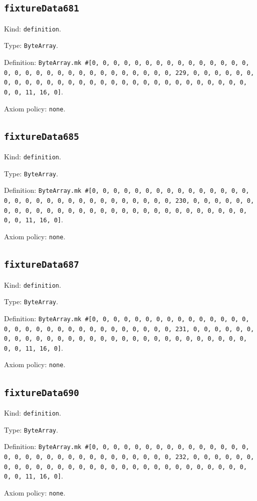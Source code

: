 \documentclass[11pt]{article}
\begin{document}
\subsection*{\texttt{fixtureData681}}
\noindent Kind: \texttt{definition}.\par
\noindent Type: \texttt{ByteArray}.\par
\noindent Definition: \texttt{ByteArray.mk \#[0, 0, 0, 0, 0, 0, 0, 0, 0, 0, 0, 0, 0, 0, 0, 0, 0, 0, 0, 0, 0, 0, 0, 0, 0, 0, 0, 0, 0, 0, 0, 229, 0, 0, 0, 0, 0, 0, 0, 0, 0, 0, 0, 0, 0, 0, 0, 0, 0, 0, 0, 0, 0, 0, 0, 0, 0, 0, 0, 0, 0, 0, 0, 11, 16, 0]}.\par
\noindent Axiom policy: \texttt{none}.\par
\subsection*{\texttt{fixtureData685}}
\noindent Kind: \texttt{definition}.\par
\noindent Type: \texttt{ByteArray}.\par
\noindent Definition: \texttt{ByteArray.mk \#[0, 0, 0, 0, 0, 0, 0, 0, 0, 0, 0, 0, 0, 0, 0, 0, 0, 0, 0, 0, 0, 0, 0, 0, 0, 0, 0, 0, 0, 0, 0, 230, 0, 0, 0, 0, 0, 0, 0, 0, 0, 0, 0, 0, 0, 0, 0, 0, 0, 0, 0, 0, 0, 0, 0, 0, 0, 0, 0, 0, 0, 0, 0, 11, 16, 0]}.\par
\noindent Axiom policy: \texttt{none}.\par
\subsection*{\texttt{fixtureData687}}
\noindent Kind: \texttt{definition}.\par
\noindent Type: \texttt{ByteArray}.\par
\noindent Definition: \texttt{ByteArray.mk \#[0, 0, 0, 0, 0, 0, 0, 0, 0, 0, 0, 0, 0, 0, 0, 0, 0, 0, 0, 0, 0, 0, 0, 0, 0, 0, 0, 0, 0, 0, 0, 231, 0, 0, 0, 0, 0, 0, 0, 0, 0, 0, 0, 0, 0, 0, 0, 0, 0, 0, 0, 0, 0, 0, 0, 0, 0, 0, 0, 0, 0, 0, 0, 11, 16, 0]}.\par
\noindent Axiom policy: \texttt{none}.\par
\subsection*{\texttt{fixtureData690}}
\noindent Kind: \texttt{definition}.\par
\noindent Type: \texttt{ByteArray}.\par
\noindent Definition: \texttt{ByteArray.mk \#[0, 0, 0, 0, 0, 0, 0, 0, 0, 0, 0, 0, 0, 0, 0, 0, 0, 0, 0, 0, 0, 0, 0, 0, 0, 0, 0, 0, 0, 0, 0, 232, 0, 0, 0, 0, 0, 0, 0, 0, 0, 0, 0, 0, 0, 0, 0, 0, 0, 0, 0, 0, 0, 0, 0, 0, 0, 0, 0, 0, 0, 0, 0, 11, 16, 0]}.\par
\noindent Axiom policy: \texttt{none}.\par
\end{document}
